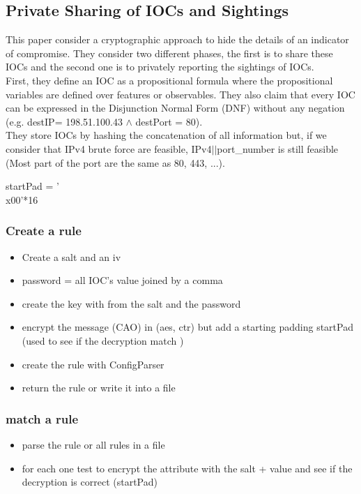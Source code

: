 \documentclass{eplmastersthesis}
\begin{document}
\subsection{Private Sharing of IOCs and Sightings \cite{van2016private}}
This paper consider a cryptographic approach to hide the details of an indicator of compromise. They consider two different phases, the first is to share these IOCs and the second one is to privately reporting the sightings of IOCs. \\
First, they define an IOC as a propositional formula where the propositional variables are defined over features or observables. They also claim that every IOC can be expressed in the Disjunction Normal Form (DNF) without any negation (e.g. destIP= 198.51.100.43 $\land$ destPort = 80).\\
They store IOCs by hashing the concatenation of all information but, if we consider that IPv4 brute force are feasible, IPv4$||$port\_number is still feasible (Most part of the port are the same as 80, 443, ...).\\


startPad = '\\x00'*16
\subsubsection{Create a rule}
\begin{itemize}
\item Create a salt and an iv
\item password = all IOC's value joined by a comma
\item create the key with from the salt and the password
\item encrypt the message (CAO) in (aes, ctr) but add a starting padding startPad (used to see if the decryption match )
\item create the rule with ConfigParser 
\item return the rule or write it into a file
\end{itemize}

\subsubsection{match a rule}
\begin{itemize}
\item parse the rule or all rules in a file
\item for each one test to encrypt the attribute with the salt + value and see if the decryption is correct (startPad)
\end{itemize}
\end{document}

